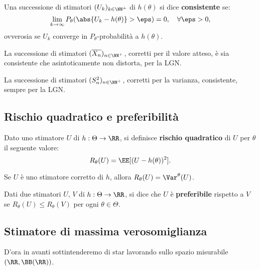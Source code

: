 \begin{multicols*}{2}
\begin{definition}
    Una successione di stimatori $(U_k)_{k \in \NN^+}$ di $h(\theta)$ si dice
    \textbf{consistente} se:
    \[
        \lim_{k \to \infty} P_\theta(\abs{U_k - h(\theta)} > \eps) = 0, \quad \forall \eps > 0,
    \]
    ovverosia se $U_k$ converge in $P_\theta$-probabilità a $h(\theta)$.
\end{definition}

\begin{remark}
    La successione di stimatori $(\overline{X_n})_{n \in \NN^+}$, corretti per
    il valore atteso, è sia consistente che
    asintoticamente non distorta, per la LGN.
\end{remark}

\begin{remark}
    La successione di stimatori $(S^2_n)_{n \in \NN^+}$, corretti per la
    varianza, consistente, sempre per la LGN.
\end{remark}

\subsection{Rischio quadratico e preferibilità}

\begin{definition}
    Dato uno stimatore $U$ di $h : \Theta \to \RR$, si definisce
    \textbf{rischio quadratico} di $U$ per $\theta$ il seguente valore:
    \[
        R_\theta(U) = \EE[(U - h(\theta))^2].
    \]
\end{definition}

\begin{remark}
    Se $U$ è uno stimatore corretto di $h$, allora
    $R_\theta(U) = \Var^\theta(U)$.
\end{remark}

\begin{definition}[Preferibilità]
    Dati due stimatori $U$, $V$ di $h : \Theta \to \RR$, si dice
    che $U$ è \textbf{preferibile} rispetto a $V$ se
    $R_\theta(U) \leq R_\theta(V)$ per ogni $\theta \in \Theta$.
\end{definition}

\subsection{Stimatore di massima verosomiglianza}

D'ora in avanti sottintenderemo di star lavorando sullo
spazio misurabile $(\RR, \BB(\RR))$.


\end{multicols*}
